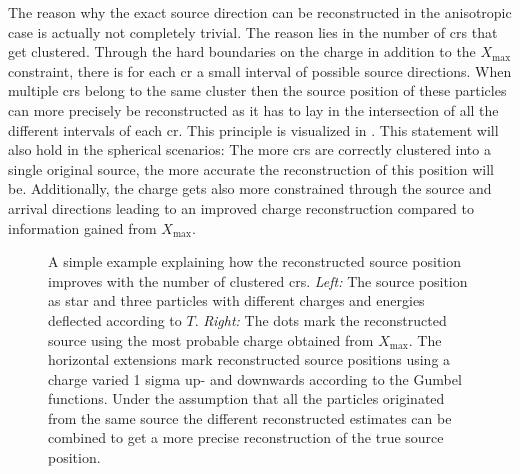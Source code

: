 The reason why the exact source direction can be reconstructed in the anisotropic case is actually not completely trivial. The reason lies in the number of \glspl{cr} that get clustered. Through the hard boundaries on the charge in addition to the \(X_{\max}\) constraint, there is for each \gls{cr} a small interval of possible source directions. When multiple \glspl{cr} belong to the same cluster then the source position of these particles can more precisely be reconstructed as it has to lay in the intersection of all the different intervals of each \gls{cr}. This principle is visualized in . This statement will also hold in the spherical scenarios: The more \glspl{cr} are correctly clustered into a single original source, the more accurate the reconstruction of this position will be. Additionally, the charge gets also more constrained through the source and arrival directions leading to an improved charge reconstruction compared to information gained from \(X_{\max}\).
\begin{figure}[ht!]
    \centering
    \begin{minipage}{0.45\textwidth}
    \end{minipage}
    \ind{}
    \begin{minipage}{0.45\textwidth}
    \end{minipage}
    \caption{A simple example explaining how the reconstructed source position improves with the number of clustered \glspl{cr}. \emph{Left:} The source position as star and three particles with different charges and energies deflected according to \(T\). \emph{Right:} The dots mark the reconstructed source using the most probable charge obtained from \(X_{\max}\). The horizontal extensions mark reconstructed source positions using a charge varied 1 sigma up- and downwards according to the Gumbel functions. Under the assumption that all the particles originated from the same source the different reconstructed estimates can be combined to get a more precise reconstruction of the true source position.}\label{fig:1d-source-reconstruction}
\end{figure}

